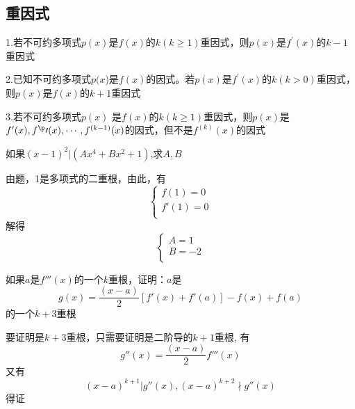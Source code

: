 \documentclass[lang=cn,10pt]{elegantbook}
\begin{document}
\subsection{重因式}
\begin{conclusion}
	
	1.若不可约多项式$p(x)$是$f(x)$的$k(k\geq1)$重因式，则$p(x)$是$f^\prime(x)$的$k-1$重因式
	
	2.已知不可约多项式$p(x$)是$f(x)$的因式。若$p(x)$是$f^\prime(x)$的$k(k>0)$重因式，则$p(x)$是$f(x)$的$k+1$重因式
	
	3.若不可约多项式$p(x)$ 是$f(x)$的$k(k\geq1)$重因式，则$p(x)$是$f^\prime(x),f^\p \prime(x),\cdots,f^{(k-1)}(x)$的因式，但不是$f^{(k)}(x)$的因式
\end{conclusion}
\begin{example}
	如果$(x-1)^{2}|(Ax^{4}+Bx^{2}+1)$,求$A,B$
\end{example}
\begin{solution}
	
	由题，1是多项式的二重根，由此，有
	\begin{equation*}
		\begin{cases}
			f\left( 1 \right) =0\\
			f\prime\left( 1 \right) =0\\
		\end{cases}
	\end{equation*}
	解得
	\begin{equation*}
		\begin{cases}
			A=1\\
			B=-2\\
		\end{cases}
	\end{equation*}
\end{solution}
\begin{example}
	如果$a$是$f'''(x)$的一个$k$重根，证明：$a$是
	\begin{equation*}
		g(x)=\frac{(x-a)}{2}[f'(x)+f'(a)]-f(x)+f(a)
	\end{equation*}
	的一个$k+3$重根
\end{example}
\begin{solution}
	
	要证明是$k+3$重根，只需要证明是二阶导的$k+1$重根,
	有
	\begin{equation*}
		g''(x)=\frac{(x-a)}{2}f'''(x)
	\end{equation*}
	又有
	\begin{equation*}
		(x-a)^{k+1}|g''(x),(x-a)^{k+2}\nmid g''(x)
	\end{equation*}
	得证
\end{solution}
\end{document}
